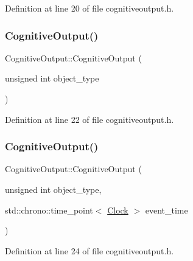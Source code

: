 Definition at line 20 of file cognitiveoutput.\+h.

\mbox{\label{class_cognitive_output_af1fca516a8a90913760e8ac5431f6f70}} 
\subsubsection{\texorpdfstring{Cognitive\+Output()}{CognitiveOutput()}\hspace{0.1cm}{\footnotesize\ttfamily [2/4]}}
{\footnotesize\ttfamily Cognitive\+Output\+::\+Cognitive\+Output (\begin{DoxyParamCaption}\item[{unsigned int}]{object\+\_\+type }\end{DoxyParamCaption})\hspace{0.3cm}{\ttfamily [inline]}}



Definition at line 22 of file cognitiveoutput.\+h.

\mbox{\label{class_cognitive_output_a4751f511d329c66ed80a3c127e5e9e6d}} 
\subsubsection{\texorpdfstring{Cognitive\+Output()}{CognitiveOutput()}\hspace{0.1cm}{\footnotesize\ttfamily [3/4]}}
{\footnotesize\ttfamily Cognitive\+Output\+::\+Cognitive\+Output (\begin{DoxyParamCaption}\item[{unsigned int}]{object\+\_\+type,  }\item[{std\+::chrono\+::time\+\_\+point$<$ \mbox{\hyperlink{universe_8h_a0ef8d951d1ca5ab3cfaf7ab4c7a6fd80}{Clock}} $>$}]{event\+\_\+time }\end{DoxyParamCaption})\hspace{0.3cm}{\ttfamily [inline]}}



Definition at line 24 of file cognitiveoutput.\+h.

\mbox{\label{class_cognitive_output_a9874901c7b49a6bb495d34c84fdbf651}} 

